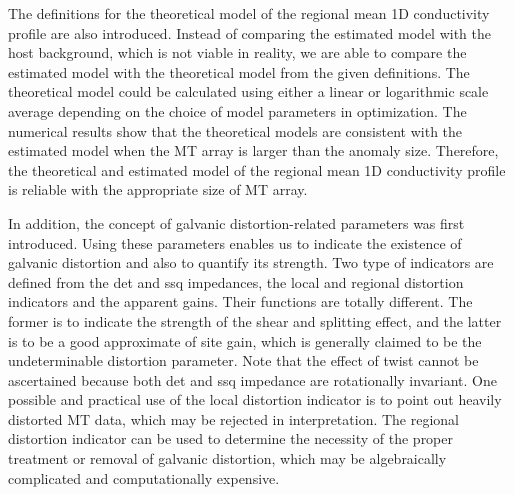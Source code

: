 	The definitions for the theoretical model of the regional mean 1D conductivity profile are also introduced. 
	Instead of comparing the estimated model with the host background, which is not viable in reality, we are able to compare the estimated model with the theoretical model from the given definitions.
	The theoretical model could be calculated using either a linear or logarithmic scale average depending on the choice of model parameters in optimization.
	The numerical results show that the theoretical models are consistent with the estimated model when the MT array is larger than the anomaly size. 
	Therefore, the theoretical and estimated model of the regional mean 1D conductivity profile is reliable with the appropriate size of MT array.

	In addition, the concept of galvanic distortion-related parameters was first introduced.
	Using these parameters enables us	to indicate the existence of galvanic distortion and also to quantify its strength. 
	Two type of indicators are defined from the det and ssq impedances, the local and regional distortion indicators and the apparent gains. Their functions are totally different. The former is to indicate the strength of the shear and splitting effect, and the latter is to be a good approximate of site gain, which is generally claimed to be the undeterminable distortion parameter.
	Note that the effect of twist cannot be ascertained because both det and ssq impedance are rotationally invariant.
	One possible and practical use of the local distortion indicator is to point out heavily distorted MT data, which may be rejected in interpretation. The regional distortion indicator can be used to determine the necessity of the proper treatment or removal of galvanic distortion, which may be algebraically complicated and computationally expensive. 	


